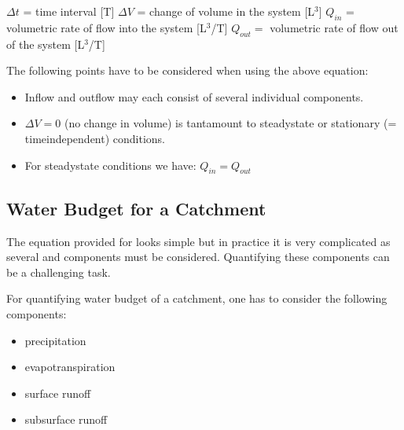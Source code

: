 \documentclass[letterpaper,10pt,english]{jupyterBook}
\begin{document}
\sphinxAtStartPar
\(\Delta t\) = time interval {[}T{]} 
\(\Delta V\) = change of volume in the system {[}L\(^3\){]} 
\(Q_{in}\) = volumetric rate of flow into the system {[}L\(^3\)/T{]} 
\(Q_{out} =\) volumetric rate of flow out of the system {[}L\(^3\)/T{]} 

\sphinxAtStartPar
The following points have to be considered when using the above equation:
\begin{itemize}
\item {} 
\sphinxAtStartPar
Inflow and outflow may each consist of several individual components. 

\item {} 
\sphinxAtStartPar
\(\Delta V = 0\) (no change in  volume) is tantamount to steady\sphinxhyphen{}state or stationary (= time\sphinxhyphen{}independent) conditions. 

\item {} 
\sphinxAtStartPar
For steady\sphinxhyphen{}state conditions we have: \(Q_{in} = Q_{out}\)

\end{itemize}


\subsection{Water Budget for a Catchment}
\label{\detokenize{content/background/03_basic_hydrogeology:water-budget-for-a-catchment}}
\sphinxAtStartPar
The equation provided for  looks simple but in practice it is very complicated as several  and  components must be considered. Quantifying these components can be a challenging task.

\sphinxAtStartPar
For quantifying water budget of a catchment, one has to consider the following components:

\sphinxAtStartPar
{}
\begin{itemize}
\item {} 
\sphinxAtStartPar
precipitation

\item {} 
\sphinxAtStartPar
evapotranspiration

\item {} 
\sphinxAtStartPar
surface runoff

\item {} 
\sphinxAtStartPar
subsurface runoff

\end{itemize}
\end{document}
